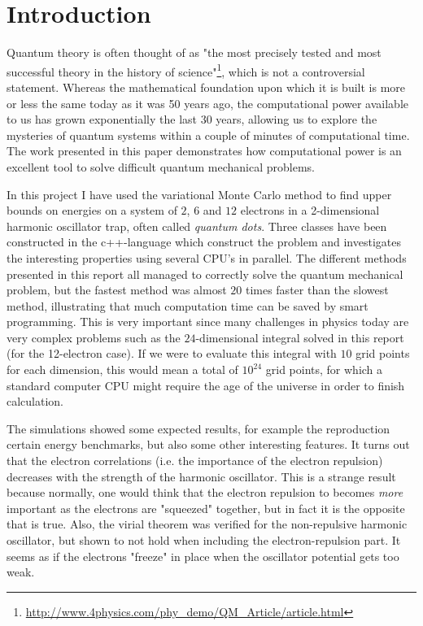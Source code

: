 \section{Introduction}

Quantum theory is often thought of as "the most precisely tested and most successful theory in the history of science"\footnote{\url{http://www.4physics.com/phy_demo/QM_Article/article.html}}, which is not a controversial statement. 
Whereas the mathematical foundation upon which it is built is more or less the same today as it was 50 years ago, the computational power available to us has grown exponentially the last 30 years, allowing us to explore the mysteries of quantum systems within a couple of minutes of computational time. 
The work presented in this paper demonstrates how computational power is an excellent tool to solve difficult quantum mechanical problems.

In this project I have used the variational Monte Carlo method to find upper bounds on energies on a system of $2$, $6$ and $12$ electrons in a 2-dimensional harmonic oscillator trap, often called \textit{quantum dots}. 
Three classes have been constructed in the c++-language which construct the problem and investigates the interesting properties using several CPU's in parallel. 
The different methods presented in this report all managed to correctly solve the quantum mechanical problem, but the fastest method was almost $20$ times faster than the slowest method, illustrating that much computation time can be saved by smart programming. 
This is very important since many challenges in physics today are very complex problems such as the $24$-dimensional integral solved in this report (for the 12-electron case).
If we were to evaluate this integral with $10$ grid points for each dimension, this would mean a total of $10^{24}$ grid points, for which a standard computer CPU might require the age of the universe in order to finish calculation. 

The simulations showed some expected results, for example the reproduction certain energy benchmarks, but also some other interesting features. 
It turns out that the electron correlations (i.e. the importance of the electron repulsion) decreases with the strength of the harmonic oscillator.
This is a strange result because normally, one would think that the electron repulsion to becomes \textit{more} important as the electrons are "squeezed" together, but in fact it is the opposite that is true. 
Also, the virial theorem was verified for the non-repulsive harmonic oscillator, but shown to not hold when including the electron-repulsion part.
It seems as if the electrons "freeze" in place when the oscillator potential gets too weak. 
